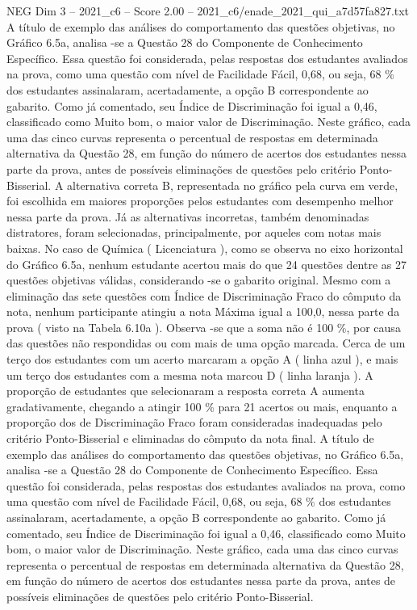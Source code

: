 \begin{textsample}{NEG Dim 3 – 2021\_c6 – Score 2.00 – 2021\_c6/enade\_2021\_qui\_a7d57fa827.txt}
A título de exemplo das análises do comportamento das questões objetivas, no Gráfico 6.5a, analisa -se a Questão 28 do Componente de Conhecimento Específico.
Essa questão foi considerada, pelas respostas dos estudantes avaliados na prova, como uma questão com nível de Facilidade Fácil, 0,68, ou seja, 68 \% dos estudantes assinalaram, acertadamente, a opção B correspondente ao gabarito.
Como já comentado, seu Índice de Discriminação foi igual a 0,46, classificado como Muito bom, o maior valor de Discriminação.
Neste gráfico, cada uma das cinco curvas representa o percentual de respostas em determinada alternativa da Questão 28, em função do número de acertos dos estudantes nessa parte da prova, antes de possíveis eliminações de questões pelo critério Ponto-Bisserial.
A alternativa correta B, representada no gráfico pela curva em verde, foi escolhida em maiores proporções pelos estudantes com desempenho melhor nessa parte da prova.
Já as alternativas incorretas, também denominadas distratores, foram selecionadas, principalmente, por aqueles com notas mais baixas.
No caso de Química ( Licenciatura ), como se observa no eixo horizontal do Gráfico 6.5a, nenhum estudante acertou mais do que 24 questões dentre as 27 questões objetivas válidas, considerando -se o gabarito original.
Mesmo com a eliminação das sete questões com Índice de Discriminação Fraco do cômputo da nota, nenhum participante atingiu a nota Máxima igual a 100,0, nessa parte da prova ( visto na Tabela 6.10a ).
Observa -se que a soma não é 100 \%, por causa das questões não respondidas ou com mais de uma opção marcada.
Cerca de um terço dos estudantes com um acerto marcaram a opção A ( linha azul ), e mais um terço dos estudantes com a mesma nota marcou D ( linha laranja ).
A proporção de estudantes que selecionaram a resposta correta A aumenta gradativamente, chegando a atingir 100 \% para 21 acertos ou mais, enquanto a proporção dos de Discriminação Fraco foram consideradas inadequadas pelo critério Ponto-Bisserial e eliminadas do cômputo da nota final.
A título de exemplo das análises do comportamento das questões objetivas, no Gráfico 6.5a, analisa -se a Questão 28 do Componente de Conhecimento Específico.
Essa questão foi considerada, pelas respostas dos estudantes avaliados na prova, como uma questão com nível de Facilidade Fácil, 0,68, ou seja, 68 \% dos estudantes assinalaram, acertadamente, a opção B correspondente ao gabarito.
Como já comentado, seu Índice de Discriminação foi igual a 0,46, classificado como Muito bom, o maior valor de Discriminação.
Neste gráfico, cada uma das cinco curvas representa o percentual de respostas em determinada alternativa da Questão 28, em função do número de acertos dos estudantes nessa parte da prova, antes de possíveis eliminações de questões pelo critério Ponto-Bisserial.

\end{textsample}
